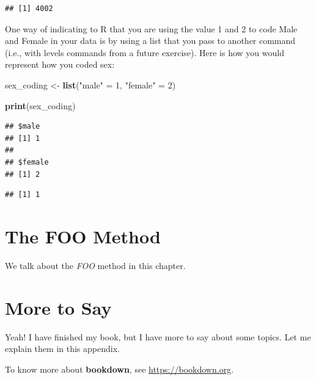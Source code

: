 \documentclass[
]{krantz}
\makeatletter
\newenvironment{Shaded}{\begin{snugshade}}{\end{snugshade}}
\newcommand{\DecValTok}[1]{\textcolor[rgb]{0.06,0.06,0.06}{#1}}
\newcommand{\KeywordTok}[1]{\textcolor[rgb]{0.27,0.27,0.27}{\textbf{#1}}}
\newcommand{\NormalTok}[1]{#1}
\newcommand{\OperatorTok}[1]{\textcolor[rgb]{0.43,0.43,0.43}{\textbf{#1}}}
\newcommand{\StringTok}[1]{\textcolor[rgb]{0.5,0.5,0.5}{#1}}
\newenvironment{kframe}{%
\medskip{}
\setlength{\fboxsep}{.8em}
 \def\at@end@of@kframe{}%
 \ifinner\ifhmode%
  \def\at@end@of@kframe{\end{minipage}}%
  \begin{minipage}{\columnwidth}%
 \fi\fi%
 \def\FrameCommand##1{\hskip\@totalleftmargin \hskip-\fboxsep
 \colorbox{shadecolor}{##1}\hskip-\fboxsep
     \hskip-\linewidth \hskip-\@totalleftmargin \hskip\columnwidth}%
 \MakeFramed {\advance\hsize-\width
   \@totalleftmargin\z@ \linewidth\hsize
   \@setminipage}}%
 {\par\unskip\endMakeFramed%
 \at@end@of@kframe}
\renewenvironment{Shaded}{\begin{kframe}}{\end{kframe}}
\makeatother
\begin{document}
\begin{Shaded}
\end{Shaded}

\begin{verbatim}
## [1] 4002
\end{verbatim}

One way of indicating to R that you are using the value 1 and 2 to code Male and Female in your data is by using a list that you pass to another command (i.e., with levels commands from a future exercise). Here is how you would represent how you coded sex:

\begin{Shaded}
\begin{Highlighting}[]
\NormalTok{sex_coding <-}\StringTok{ }\KeywordTok{list}\NormalTok{(}\StringTok{"male"}\NormalTok{ =}\StringTok{ }\DecValTok{1}\NormalTok{,}
                   \StringTok{"female"}\NormalTok{ =}\StringTok{ }\DecValTok{2}\NormalTok{)}

\KeywordTok{print}\NormalTok{(sex_coding)}
\end{Highlighting}
\end{Shaded}

\begin{verbatim}
## $male
## [1] 1
## 
## $female
## [1] 2
\end{verbatim}

\begin{Shaded}
\end{Shaded}

\begin{verbatim}
## [1] 1
\end{verbatim}

\hypertarget{the-foo-method}{%
\chapter{The FOO Method}\label{the-foo-method}}

We talk about the \emph{FOO} method in this chapter.

\cleardoublepage

\hypertarget{appendix-appendix}{%
\appendix {}}


\hypertarget{more-to-say}{%
\chapter{More to Say}\label{more-to-say}}

Yeah! I have finished my book, but I have more to say about some topics. Let me explain them in this appendix.

To know more about \textbf{bookdown}, see \url{https://bookdown.org}.

  

\backmatter
\printindex
\end{document}
